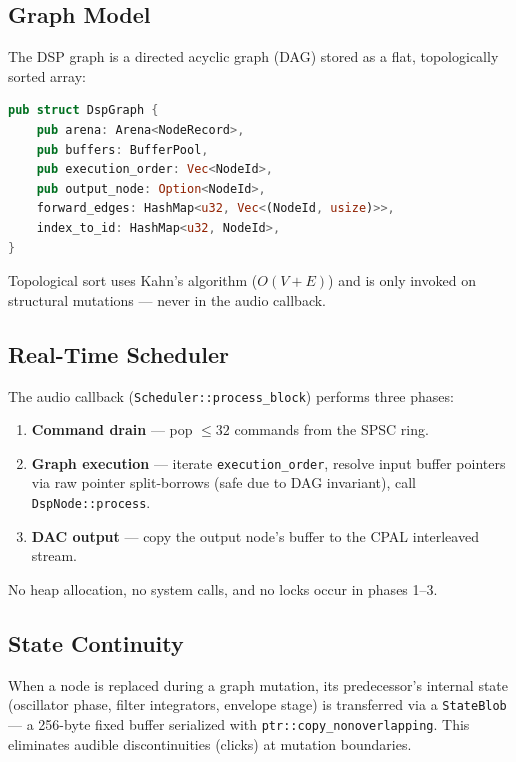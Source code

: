 \documentclass[conference]{IEEEtran}
\begin{document}
\subsection{Graph Model}

The DSP graph is a directed acyclic graph (DAG) stored as a flat,
topologically sorted array:

\begin{lstlisting}[language=Rust]
pub struct DspGraph {
    pub arena: Arena<NodeRecord>,
    pub buffers: BufferPool,
    pub execution_order: Vec<NodeId>,
    pub output_node: Option<NodeId>,
    forward_edges: HashMap<u32, Vec<(NodeId, usize)>>,
    index_to_id: HashMap<u32, NodeId>,
}
\end{lstlisting}

Topological sort uses Kahn's algorithm ($O(V+E)$) and is only invoked on
structural mutations — never in the audio callback.

\subsection{Real-Time Scheduler}

The audio callback (\texttt{Scheduler::process\_block}) performs three phases:

\begin{enumerate}
  \item \textbf{Command drain} — pop $\leq 32$ commands from the SPSC ring.
  \item \textbf{Graph execution} — iterate \texttt{execution\_order}, resolve
    input buffer pointers via raw pointer split-borrows (safe due to DAG
    invariant), call \texttt{DspNode::process}.
  \item \textbf{DAC output} — copy the output node's buffer to the CPAL
    interleaved stream.
\end{enumerate}

No heap allocation, no system calls, and no locks occur in phases 1--3.

\subsection{State Continuity}

When a node is replaced during a graph mutation, its predecessor's internal
state (oscillator phase, filter integrators, envelope stage) is transferred via
a \texttt{StateBlob} — a 256-byte fixed buffer serialized with
\texttt{ptr::copy\_nonoverlapping}. This eliminates audible discontinuities
(clicks) at mutation boundaries.
\end{document}
